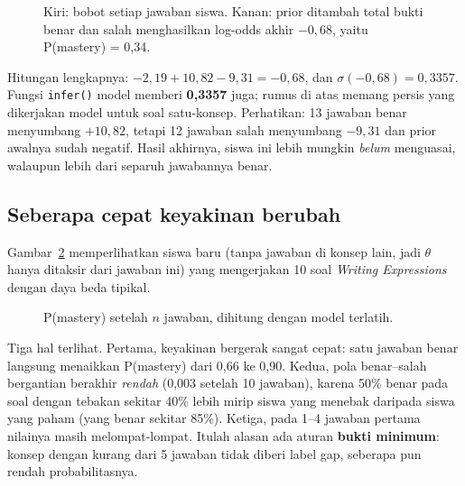 \documentclass[11pt,a4paper]{article}
\begin{document}
\begin{figure}[h]
  \centering
  \setlength\figH{4.4cm}
  \begin{minipage}[c]{0.6\linewidth}\end{minipage}\hfill
  \begin{minipage}[c]{0.37\linewidth}\resizebox{\linewidth}{!}{}\end{minipage}
  \caption{Kiri: bobot setiap jawaban siswa. Kanan: prior ditambah total bukti benar dan salah menghasilkan log-odds
  akhir $-0{,}68$, yaitu P(mastery) = 0,34.}
  \label{fig:worked}
\end{figure}

Hitungan lengkapnya: $-2{,}19+10{,}82-9{,}31=-0{,}68$, dan $\sigma(-0{,}68)=0{,}3357$. Fungsi \texttt{infer()} model
memberi \textbf{0,3357} juga; rumus di atas memang persis yang dikerjakan model untuk soal satu-konsep. Perhatikan:
13 jawaban benar menyumbang $+10{,}82$, tetapi 12 jawaban salah menyumbang $-9{,}31$ dan prior awalnya sudah negatif.
Hasil akhirnya, siswa ini lebih mungkin \emph{belum} menguasai, walaupun lebih dari separuh jawabannya benar.

\subsection{Seberapa cepat keyakinan berubah}

Gambar~\ref{fig:traj} memperlihatkan siswa baru (tanpa jawaban di konsep lain, jadi $\theta$ hanya ditaksir dari
jawaban ini) yang mengerjakan 10 soal \emph{Writing Expressions} dengan daya beda tipikal.

\begin{figure}[h]
  \centering
  \setlength\figH{5cm}
  \begin{minipage}{0.75\linewidth}\end{minipage}
  \caption{P(mastery) setelah $n$ jawaban, dihitung dengan model terlatih.}
  \label{fig:traj}
\end{figure}

Tiga hal terlihat. Pertama, keyakinan bergerak sangat cepat: satu jawaban benar langsung menaikkan P(mastery) dari
0,66 ke 0,90. Kedua, pola benar--salah bergantian berakhir \emph{rendah} (0,003 setelah 10 jawaban), karena 50\% benar
pada soal dengan tebakan sekitar 40\% lebih mirip siswa yang menebak daripada siswa yang paham (yang benar sekitar
85\%). Ketiga, pada 1--4 jawaban pertama nilainya masih melompat-lompat. Itulah alasan ada aturan \textbf{bukti minimum}:
konsep dengan kurang dari 5 jawaban tidak diberi label gap, seberapa pun rendah probabilitasnya.
\end{document}
